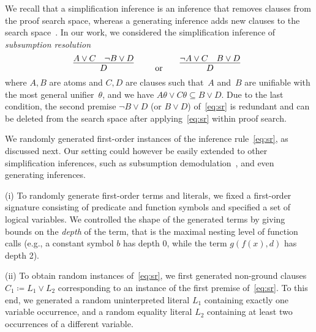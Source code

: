 We recall that a simplification inference is an inference
that removes clauses from the proof search space, whereas a generating
inference adds new clauses to the search space~\cite{Vampire13}. In our work, we
considered the simplification inference of 
\emph{subsumption resolution} 
\begin{equation}\label{eq:sr}
    \infer[]{
      D
      }{
      A\vee C
      &
      {\neg B \vee D}
    }
    \qquad \text{or}\qquad
    \infer[]{
      D
      }{
      \neg A\vee C
      &
      {B \vee D}
    }
\end{equation}
where $A,B$ are atoms and $C,D$ are clauses
such that~$A$ and~$B$ are unifiable with the most general unifier~$\theta$,
and we have $A\theta\vee C\theta\subseteq B\vee D$.
Due to the last condition, the second premise $\neg B \vee D$ (or $B \vee D$)
of~\eqref{eq:sr} is redundant and can  be deleted from the search
space after applying~\eqref{eq:sr} within proof search.

We randomly generated first-order instances of the inference rule~\eqref{eq:sr}, as
discussed next. Our setting could however be easily extended to other
simplification inferences, such as subsumption demodulation~\cite{Rath20},
and even generating inferences.

\noindent (i) To randomly generate first-order terms and literals,
we fixed a first-order signature consisting of %
predicate and function symbols and specified a set of logical
variables. 
We controlled the shape of the generated terms
by giving bounds on the \emph{depth} of the term,
that is the maximal nesting level of function calls
(e.g., a constant symbol $b$ has depth 0, while the term $g(f(x),d)$ has depth 2).\smallskip


\noindent (ii)  To obtain random instances of~\eqref{eq:sr}, 
we first generated non-ground clauses $C_1 \coloneqq L_1 \lor L_2$
corresponding to an instance of the first premise of~\eqref{eq:sr}.
To this end, we generated a random uninterpreted literal $L_1$ containing exactly one variable occurrence,
and a random equality literal $L_2$ containing at least two occurrences of a different variable.\smallskip

